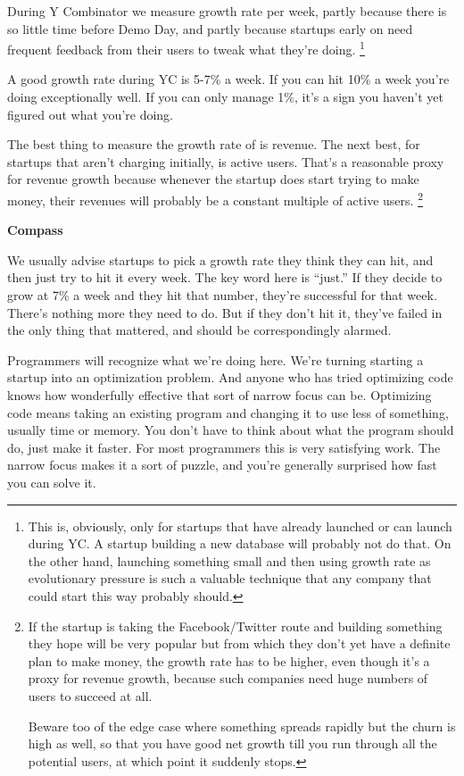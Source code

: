 \documentclass[12pt]{book}
\begin{document}
During Y Combinator we measure growth rate per week, partly because
there is so little time before Demo Day, and partly because startups
early on need frequent feedback from their users to tweak what they're
doing. \footnote{This is, obviously, only for startups that have already launched
or can launch during YC. A startup building a new database will probably
not do that. On the other hand, launching something small and then using
growth rate as evolutionary pressure is such a valuable technique that
any company that could start this way probably should.}

A good growth rate during YC is 5-7\% a week. If you can hit 10\% a week
you're doing exceptionally well. If you can only manage 1\%, it's a sign
you haven't yet figured out what you're doing.

The best thing to measure the growth rate of is revenue. The next best,
for startups that aren't charging initially, is active users. That's a
reasonable proxy for revenue growth because whenever the startup does
start trying to make money, their revenues will probably be a constant
multiple of active users. \footnote{If the startup is taking the Facebook/Twitter route and building
something they hope will be very popular but from which they don't yet
have a definite plan to make money, the growth rate has to be higher,
even though it's a proxy for revenue growth, because such companies need
huge numbers of users to succeed at all.

Beware too of the edge case where something spreads rapidly but the
churn is high as well, so that you have good net growth till you run
through all the potential users, at which point it suddenly stops.}

\textbf{Compass}

We usually advise startups to pick a growth rate they think they can
hit, and then just try to hit it every week. The key word here is
``just.'' If they decide to grow at 7\% a week and they hit that number,
they're successful for that week. There's nothing more they need to do.
But if they don't hit it, they've failed in the only thing that
mattered, and should be correspondingly alarmed.

Programmers will recognize what we're doing here. We're turning starting
a startup into an optimization problem. And anyone who has tried
optimizing code knows how wonderfully effective that sort of narrow
focus can be. Optimizing code means taking an existing program and
changing it to use less of something, usually time or memory. You don't
have to think about what the program should do, just make it faster. For
most programmers this is very satisfying work. The narrow focus makes it
a sort of puzzle, and you're generally surprised how fast you can solve
it.
\end{document}
